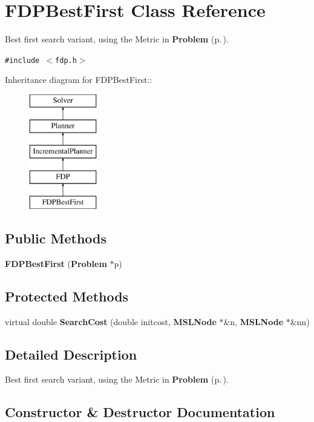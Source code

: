 \section{FDPBest\-First  Class Reference}
\label{classFDPBestFirst}
Best first search variant, using the Metric in {\bf Problem} {\rm (p.\,\pageref{classProblem})}. 


{\tt \#include $<$fdp.h$>$}

Inheritance diagram for FDPBest\-First::\begin{figure}[H]
\begin{center}
\leavevmode
\includegraphics[height=5cm]{classFDPBestFirst}
\end{center}
\end{figure}
\subsection*{Public Methods}
\begin{CompactItemize}
\item 
{\bf FDPBest\-First} ({\bf Problem} $\ast$p)
\end{CompactItemize}
\subsection*{Protected Methods}
\begin{CompactItemize}
\item 
virtual double {\bf Search\-Cost} (double initcost, {\bf MSLNode} $\ast$\&n, {\bf MSLNode} $\ast$\&nn)
\end{CompactItemize}


\subsection{Detailed Description}
Best first search variant, using the Metric in {\bf Problem} {\rm (p.\,\pageref{classProblem})}.



\subsection{Constructor \& Destructor Documentation}
